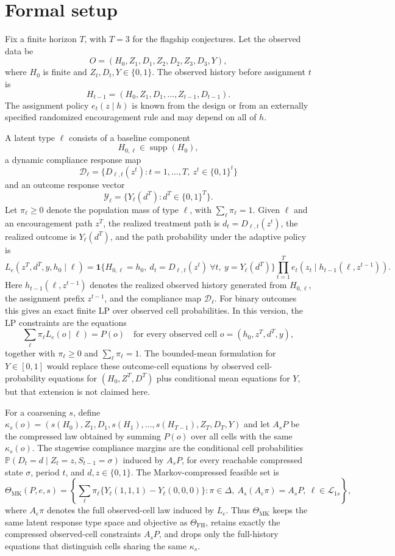 \documentclass[11pt]{article}
\renewcommand{\Pr}{\mathbb{P}}
\newcommand{\one}{\mathbf{1}}
\theoremstyle{definition}
\theoremstyle{plain}
\theoremstyle{remark}
\begin{document}
\section{Formal setup}
Fix a finite horizon \(T\), with \(T=3\) for the flagship conjectures.  Let the observed data be
\[
O=(H_0,Z_1,D_1,Z_2,D_2,Z_3,D_3,Y),
\]
where \(H_0\) is finite and \(Z_t,D_t,Y\in\{0,1\}\).  The observed history before assignment \(t\) is
\[
H_{t-1}=(H_0,Z_1,D_1,\ldots,Z_{t-1},D_{t-1}).
\]
The assignment policy \(e_t(z\mid h)\) is known from the design or from an externally specified randomized encouragement rule and may depend on all of \(h\).

A latent type \(\ell\) consists of a baseline component
\[
H_{0,\ell}\in\operatorname{supp}(H_0),
\]
a dynamic compliance response map
\[
\mathcal{D}_{\ell}=\{D_{\ell,t}(z^t):t=1,\ldots,T,\ z^t\in\{0,1\}^t\}
\]
and an outcome response vector
\[
\mathcal{Y}_{\ell}=\{Y_{\ell}(d^T):d^T\in\{0,1\}^T\}.
\]
Let \(\pi_\ell\ge0\) denote the population mass of type \(\ell\), with \(\sum_\ell \pi_\ell=1\).  Given \(\ell\) and an encouragement path \(z^T\), the realized treatment path is \(d_t=D_{\ell,t}(z^t)\), the realized outcome is \(Y_\ell(d^T)\), and the path probability under the adaptive policy is
\[
L_e(z^T,d^T,y,h_0\mid \ell)
=\one\{H_{0,\ell}=h_0,\ d_t=D_{\ell,t}(z^t)\ \forall t,\ y=Y_\ell(d^T)\}
  \prod_{t=1}^T e_t(z_t\mid h_{t-1}(\ell,z^{t-1})).
\]
Here \(h_{t-1}(\ell,z^{t-1})\) denotes the realized observed history generated from \(H_{0,\ell}\), the assignment prefix \(z^{t-1}\), and the compliance map \(\mathcal{D}_{\ell}\).
For binary outcomes this gives an exact finite LP over observed cell probabilities.  In this version, the LP constraints are the equations
\[
\sum_{\ell}\pi_\ell L_e(o\mid \ell)=P(o)
\quad\text{for every observed cell }o=(h_0,z^T,d^T,y),
\]
together with \(\pi_\ell\ge0\) and \(\sum_\ell\pi_\ell=1\).  The bounded-mean formulation for \(Y\in[0,1]\) would replace these outcome-cell equations by observed cell-probability equations for \((H_0,Z^T,D^T)\) plus conditional mean equations for \(Y\), but that extension is not claimed here.

For a coarsening \(s\), define \(\kappa_s(o)=(s(H_0),Z_1,D_1,s(H_1),\ldots,s(H_{T-1}),Z_T,D_T,Y)\) and let \(A_sP\) be the compressed law obtained by summing \(P(o)\) over all cells with the same \(\kappa_s(o)\).  The stagewise compliance margins are the conditional cell probabilities \(\Pr(D_t=d\mid Z_t=z,S_{t-1}=\sigma)\) induced by \(A_sP\), for every reachable compressed state \(\sigma\), period \(t\), and \(d,z\in\{0,1\}\).  The Markov-compressed feasible set is
\[
\Theta_{\mathrm{MK}}(P,e,s)=
\left\{\sum_\ell \pi_\ell\{Y_\ell(1,1,1)-Y_\ell(0,0,0)\}:
\pi\in\Delta,\ A_s(A_e\pi)=A_sP,\ \ell\in\mathcal{L}_{1s}\right\},
\]
where \(A_e\pi\) denotes the full observed-cell law induced by \(L_e\).  Thus \(\Theta_{\mathrm{MK}}\) keeps the same latent response type space and objective as \(\Theta_{\mathrm{FH}}\), retains exactly the compressed observed-cell constraints \(A_sP\), and drops only the full-history equations that distinguish cells sharing the same \(\kappa_s\).
\end{document}
